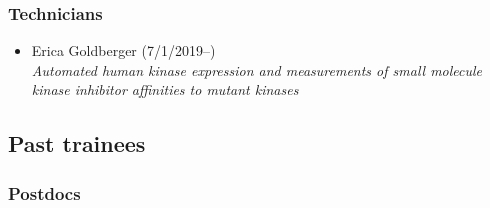 \documentclass[10pt]{article}
\begin{document}
\subsubsection*{Technicians}

\begin{itemize}
  \item Erica Goldberger (7/1/2019--)\\
  \emph{Automated human kinase expression and measurements of small molecule kinase inhibitor affinities to mutant kinases}

\end{itemize}

\eject

\subsection*{Past trainees}

\subsubsection*{Postdocs}
\end{document}
